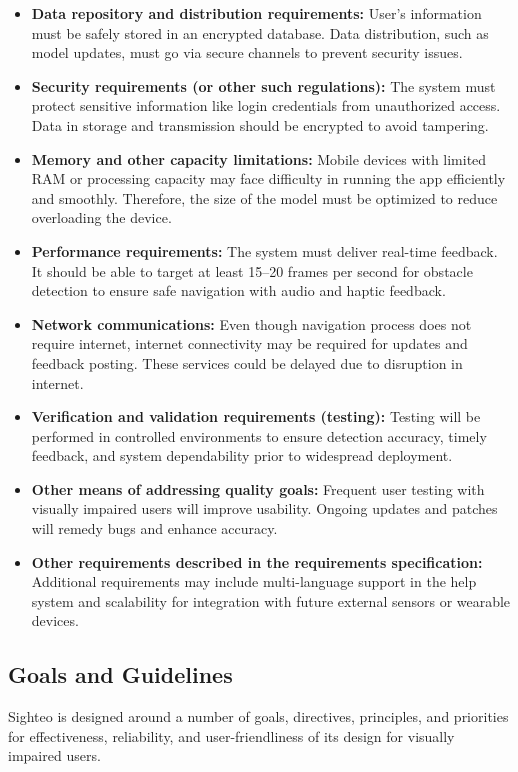 \documentclass{FastFyp}
\begin{document}
\begin{itemize}
    \item \textbf{Data repository and distribution requirements:} User's information must be safely stored in an encrypted database. Data distribution, such as model updates, must go via secure channels to prevent security issues.
    \item \textbf{Security requirements (or other such regulations):} The system must protect sensitive information like login credentials from unauthorized access. Data in storage and transmission should be encrypted to avoid tampering.
    \item  \textbf{Memory and other capacity limitations:} Mobile devices with limited RAM or processing capacity may face difficulty in running the app efficiently and smoothly. Therefore, the size of the model must be optimized to reduce overloading the device.
    \item \textbf{Performance requirements:} The system must deliver real-time feedback. It should be able to target at least 15–20 frames per second for obstacle detection to ensure safe navigation with audio and haptic feedback.
    \item \textbf{Network communications:} Even though navigation process does not require internet, internet connectivity may be required for updates and feedback posting. These services could be delayed due to disruption in internet.
    \item \textbf{Verification and validation requirements (testing):} Testing will be performed in controlled environments to ensure detection accuracy, timely feedback, and system dependability prior to widespread deployment.
    \item \textbf{Other means of addressing quality goals:} Frequent user testing with visually impaired users will improve usability. Ongoing updates and patches will remedy bugs and enhance accuracy.
    \item \textbf{Other requirements described in the requirements specification:} Additional requirements may include multi-language support in the help system and scalability for integration with future external sensors or wearable devices. 
\end{itemize}
\subsection{Goals and Guidelines}

 

Sighteo is designed around a number of goals, directives, principles, and priorities for effectiveness, reliability, and user-friendliness of its design for visually impaired users. 
\end{document}
